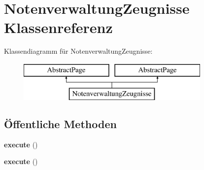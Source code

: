 \hypertarget{class_notenverwaltung_zeugnisse}{}\section{Notenverwaltung\+Zeugnisse Klassenreferenz}
\label{class_notenverwaltung_zeugnisse}
Klassendiagramm für Notenverwaltung\+Zeugnisse\+:\begin{figure}[H]
\begin{center}
\leavevmode
\includegraphics[height=2.000000cm]{class_notenverwaltung_zeugnisse}
\end{center}
\end{figure}
\subsection*{Öffentliche Methoden}
\begin{DoxyCompactItemize}
\item 
\mbox{\label{class_notenverwaltung_zeugnisse_a4c3aee0f8c24e491081422bf56caf569}} 
{\bfseries execute} ()
\item 
\mbox{\label{class_notenverwaltung_zeugnisse_a4c3aee0f8c24e491081422bf56caf569}} 
{\bfseries execute} ()
\end{DoxyCompactItemize}
